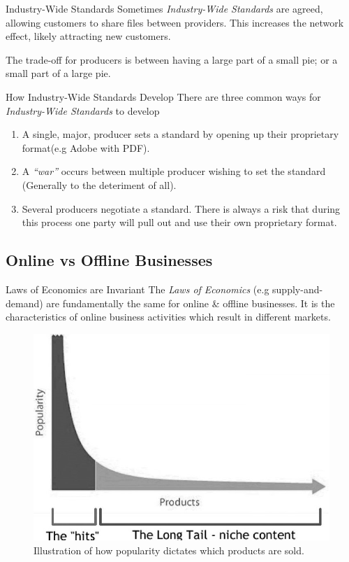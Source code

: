 \documentclass[11pt,a4paper]{article}
\begin{document}
  \begin{remark}{Industry-Wide Standards}
    Sometimes \textit{Industry-Wide Standards} are agreed, allowing customers to share files between providers. This increases the network effect, likely attracting new customers.
    \par The trade-off for producers is between having a large part of a small pie; or a small part of a large pie.
  \end{remark}

  \begin{proposition}{How Industry-Wide Standards Develop}
    There are three common ways for \textit{Industry-Wide Standards} to develop
    \begin{enumerate}
      \item A single, major, producer sets a standard by opening up their proprietary format(e.g Adobe with PDF).
      \item A \textit{``war''} occurs between multiple producer wishing to set the standard (Generally to the deteriment of all).
      \item Several producers negotiate a standard. There is always a risk that during this process one party will pull out and use their own proprietary format.
    \end{enumerate}
  \end{proposition}

\subsection{Online vs Offline Businesses} \label{sec_OnlineVsOfflineBusinesses}

  \begin{remark}{Laws of Economics are Invariant}
    The \textit{Laws of Economics} (e.g supply-and-demand) are fundamentally the same for online \& offline businesses. It is the characteristics of online business activities which result in different markets.
  \end{remark}

  \begin{figure}[ht!]
    \centering
    \includegraphics[width=.5\textwidth]{LongTail.jpg}
    \caption{Illustration of how popularity dictates which products are sold.}
    \label{fig_LongTail}
  \end{figure}
\end{document}
